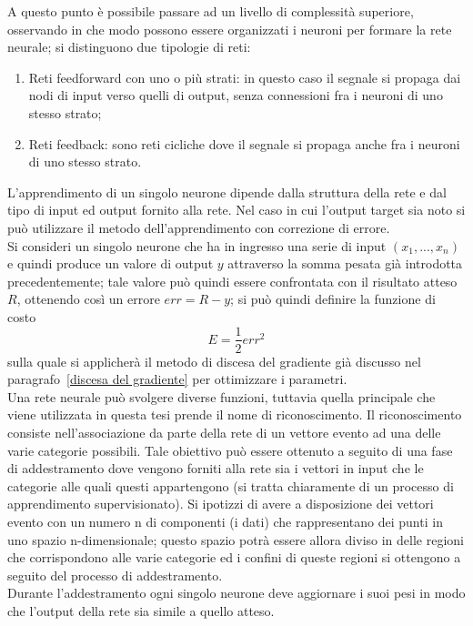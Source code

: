 A questo punto è possibile passare ad un livello di complessità superiore, osservando in che modo possono essere organizzati i neuroni per formare la rete neurale; si distinguono due tipologie di reti:
\begin{enumerate}
	\item Reti feedforward con uno o più strati: in questo caso il segnale si propaga dai nodi di input verso quelli di output, senza connessioni fra i neuroni di uno stesso strato;
	\item Reti feedback: sono reti cicliche dove il segnale si propaga anche fra i neuroni di uno stesso strato.
\end{enumerate}
L'apprendimento di un singolo neurone dipende dalla struttura della rete e dal tipo di input ed output fornito alla rete. Nel caso in cui l'output target sia noto si può utilizzare il metodo dell'apprendimento con correzione di errore. \\
Si consideri un singolo neurone che ha in ingresso una serie di input $(x_1,...,x_n)$ e quindi produce un valore di output $y$ attraverso la somma pesata già introdotta precedentemente; tale valore può quindi essere confrontata con il risultato atteso $R$, ottenendo così un errore $err = R - y$; si può quindi definire la funzione di costo
\begin{equation}
E = \frac{1}{2}err^2
\end{equation}
sulla quale si applicherà il metodo di discesa del gradiente già discusso nel paragrafo~\ref{discesa del gradiente} per ottimizzare i parametri.\\
Una rete neurale può svolgere diverse funzioni, tuttavia quella principale che viene utilizzata in questa tesi prende il nome di riconoscimento. Il riconoscimento consiste nell'associazione da parte della rete di un vettore evento ad una delle varie categorie possibili. Tale obiettivo può essere ottenuto a seguito di una fase di addestramento dove vengono forniti alla rete sia i vettori in input che le categorie alle quali questi appartengono (si tratta chiaramente di un processo di apprendimento supervisionato). Si ipotizzi di avere a disposizione dei vettori evento con un numero n di componenti (i dati) che rappresentano dei punti in uno spazio n-dimensionale; questo spazio potrà essere allora diviso in delle regioni che corrispondono alle varie categorie ed i confini di queste regioni si ottengono a seguito del processo di addestramento. \\
Durante l'addestramento ogni singolo neurone deve aggiornare i suoi pesi in modo che l'output della rete sia simile a quello atteso. \\
